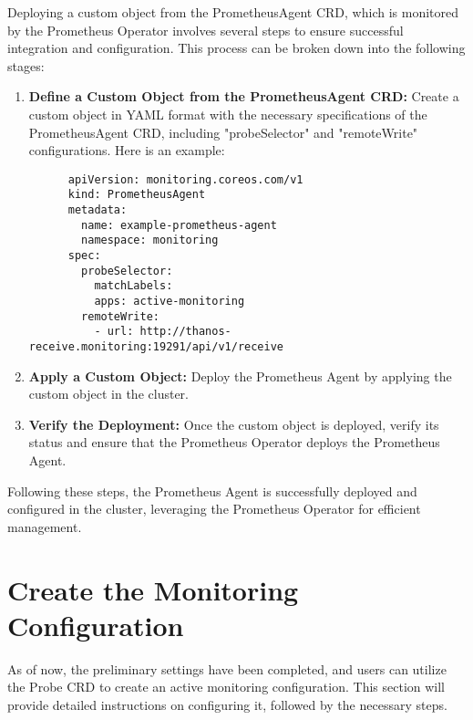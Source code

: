 Deploying a custom object from the PrometheusAgent \ac{CRD}, which is monitored by the Prometheus Operator involves several steps to ensure successful integration and configuration. This process can be broken down into the following stages:

\begin{enumerate}
\item \textbf{Define a Custom Object from the PrometheusAgent \ac{CRD}:}
Create a custom object in YAML format with the necessary specifications of the PrometheusAgent \ac{CRD}, including "probeSelector" and "remoteWrite" configurations. Here is an example:

  \begin{minipage}{\linewidth}
    \begin{lstlisting}
      apiVersion: monitoring.coreos.com/v1
      kind: PrometheusAgent
      metadata:
        name: example-prometheus-agent
        namespace: monitoring
      spec:
        probeSelector:
          matchLabels:
          apps: active-monitoring
        remoteWrite:
          - url: http://thanos-receive.monitoring:19291/api/v1/receive
    \end{lstlisting}
  \end{minipage}

\item \textbf{Apply a Custom Object:}
Deploy the Prometheus Agent by applying the custom object in the cluster. 
\item \textbf{Verify the Deployment:}
Once the custom object is deployed, verify its status and ensure that the Prometheus Operator deploys the Prometheus Agent. 
\end{enumerate}

Following these steps, the Prometheus Agent is successfully deployed and configured in the cluster, leveraging the Prometheus Operator for efficient management. 

\section{Create the Monitoring Configuration}

As of now, the preliminary settings have been completed, and users can utilize the Probe \ac{CRD} to create an active monitoring configuration. This section will provide detailed instructions on configuring it, followed by the necessary steps. 

